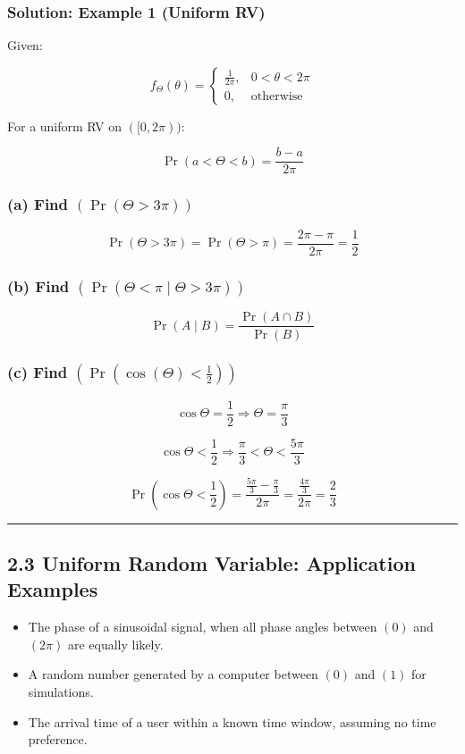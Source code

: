 \documentclass[12pt]{article}
\begin{document}
\subsubsection*{\textbf{Solution: Example 1 (Uniform RV)}}

Given:

\[
f_\Theta(\theta)=
\begin{cases}
\frac{1}{2\pi}, & 0<\theta<2\pi \\
0, & \text{otherwise}
\end{cases}
\]

For a uniform RV on $([0,2\pi))$:

\[
\Pr(a<\Theta<b)=\frac{b-a}{2\pi}
\]

\subsubsection*{\textbf{(a) Find $(\Pr(\Theta > 3\pi))$}}

\[
\Pr(\Theta > 3\pi)=\Pr(\Theta>\pi)=\frac{2\pi-\pi}{2\pi}=\frac{1}{2}
\]

\subsubsection*{\textbf{(b) Find $(\Pr(\Theta < \pi \mid \Theta > 3\pi))$}}

\[
\Pr(A\mid B)=\frac{\Pr(A\cap B)}{\Pr(B)}
\]

\subsubsection*{\textbf{(c) Find $(\Pr(\cos(\Theta)<\frac{1}{2}))$}}

\[
\cos\Theta=\frac{1}{2}\Rightarrow \Theta=\frac{\pi}{3}
\]

\[
\cos\Theta<\frac{1}{2}\Rightarrow \frac{\pi}{3}<\Theta<\frac{5\pi}{3}
\]

\[
\Pr\left(\cos\Theta<\frac{1}{2}\right)=\frac{\frac{5\pi}{3}-\frac{\pi}{3}}{2\pi}
=\frac{\frac{4\pi}{3}}{2\pi}=\frac{2}{3}
\]

\hrule
\vspace{1em}

\subsection*{\textbf{2.3 Uniform Random Variable: Application Examples}}

\begin{itemize}
    \item The phase of a sinusoidal signal, when all phase angles between $(0)$ and $(2\pi)$ are equally likely.
    \item A random number generated by a computer between $(0)$ and $(1)$ for simulations.
    \item The arrival time of a user within a known time window, assuming no time preference.
\end{itemize}
\end{document}
